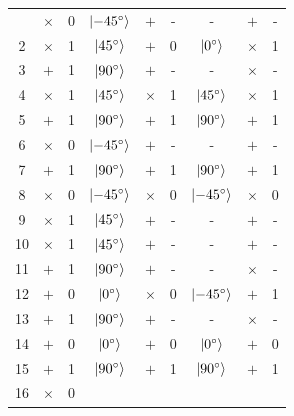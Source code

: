 \begin{longtable}{c|ccc|ccc|cc}
  \bottomrule
  \endlastfoot
  1                                       & $\times$ & 0 &
  $\ket{\SI{-45}{\degree}}$ & $+$      & - & -
  & $+$      & - \\
  \rowcolor{orange!20} 2  & $\times$ & 1 & $\ket{\SI{45}{\degree}}$
  & $+$      & 0 & $\ket{\SI{0}{\degree}}$        & $\times$ & 1 \\
  3                                       & $+$      & 1 &
  $\ket{\SI{90}{\degree}}$  & $+$      & - & -
  & $\times$ & - \\
  \rowcolor{blue!20} 4  & $\times$ & 1 & $\ket{\SI{45}{\degree}}$
  & $\times$ & 1 & $\ket{\SI{45}{\degree}}$  & $\times$ & 1 \\
  \rowcolor{blue!20} 5  & $+$      & 1 & $\ket{\SI{90}{\degree}}$
  & $+$      & 1 & $\ket{\SI{90}{\degree}}$  & $+$      & 1 \\
  6                                       & $\times$ & 0 &
  $\ket{\SI{-45}{\degree}}$ & $+$      & - & -
  & $+$      & - \\
  \rowcolor{blue!20} 7  & $+$      & 1 & $\ket{\SI{90}{\degree}}$
  & $+$      & 1 & $\ket{\SI{90}{\degree}}$  & $+$      & 1 \\
  \rowcolor{blue!20} 8  & $\times$ & 0 & $\ket{\SI{-45}{\degree}}$
  & $\times$ & 0 & $\ket{\SI{-45}{\degree}}$ & $\times$ & 0 \\
  9                                       & $\times$ & 1 &
  $\ket{\SI{45}{\degree}}$  & $+$      & - & -
  & $+$      & - \\
  10                                      & $\times$ & 1 &
  $\ket{\SI{45}{\degree}}$  & $+$      & - & -
  & $+$      & - \\
  11                                      & $+$      & 1 &
  $\ket{\SI{90}{\degree}}$  & $+$      & - & -
  & $\times$ & - \\
  \rowcolor{red!20} 12 & $+$      & 0 & $\ket{\SI{0}{\degree}}$
  & $\times$      & 0 & $\ket{\SI{-45}{\degree}}$   & $+$      & 1 \\
  13                                      & $+$      & 1 &
  $\ket{\SI{90}{\degree}}$  & $+$      & - & -
  & $\times$ & - \\
  \rowcolor{blue!20} 14 & $+$      & 0 & $\ket{\SI{0}{\degree}}$
  & $+$      & 0 & $\ket{\SI{0}{\degree}}$   & $+$      & 0 \\
  \rowcolor{blue!20} 15 & $+$      & 1 & $\ket{\SI{90}{\degree}}$
  & $+$      & 1 & $\ket{\SI{90}{\degree}}$  & $+$      & 1 \\
  16                                      & $\times$ & 0 &

\end{longtable}
